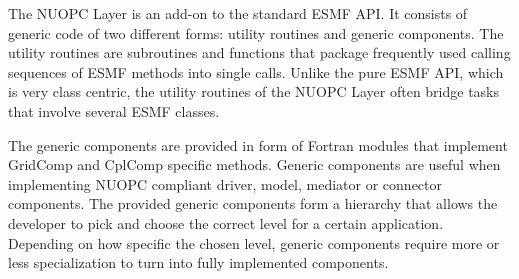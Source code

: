 %
The NUOPC Layer is an add-on to the standard ESMF API. It consists of generic code of two different forms: utility routines and generic components. The utility routines are subroutines and functions that package frequently used calling sequences of ESMF methods into single calls. Unlike the pure ESMF API, which is very class centric, the utility routines of the NUOPC Layer often bridge tasks that involve several ESMF classes.

The generic components are provided in form of Fortran modules that implement GridComp and CplComp specific methods. Generic components are useful when implementing NUOPC compliant driver, model, mediator or connector components. The provided generic components form a hierarchy that allows the developer to pick and choose the correct level for a certain application. Depending on how specific the chosen level, generic components require more or less specialization to turn into fully implemented components.
